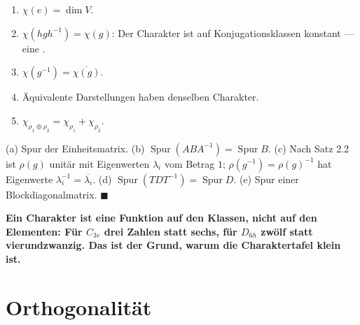 \begin{merksatz}
\begin{enumerate}[label=(\alph*), leftmargin=1.6em]
\item $\chi(e) = \dim V$.
\item $\chi(hgh^{-1}) = \chi(g)$: Der Charakter ist auf Konjugationsklassen konstant --- eine .
\item $\chi(g^{-1}) = \overline{\chi(g)}$.
\item Äquivalente Darstellungen haben denselben Charakter.
\item $\chi_{\rho_1\oplus\rho_2} = \chi_{\rho_1} + \chi_{\rho_2}$.
\end{enumerate}

(a) Spur der Einheitsmatrix. (b) $\operatorname{Spur}(ABA^{-1}) = \operatorname{Spur}B$. (c) Nach Satz 2.2 ist $\rho(g)$ unitär mit Eigenwerten $\lambda_i$ vom Betrag $1$; $\rho(g^{-1}) = \rho(g)^{-1}$ hat Eigenwerte $\lambda_i^{-1} = \overline{\lambda_i}$. (d) $\operatorname{Spur}(TDT^{-1}) = \operatorname{Spur}D$. (e) Spur einer Blockdiagonalmatrix. $\blacksquare$

\begin{center}
\begin{minipage}{0.9\textwidth}
\textbf{Ein Charakter ist eine Funktion auf den Klassen, nicht auf den Elementen: Für $C_{3v}$ drei Zahlen statt sechs, für $D_{6h}$ zwölf statt vierundzwanzig. Das ist der Grund, warum die Charaktertafel klein ist.}
\end{minipage}
\end{center}
\end{merksatz}

\section{Orthogonalität}

